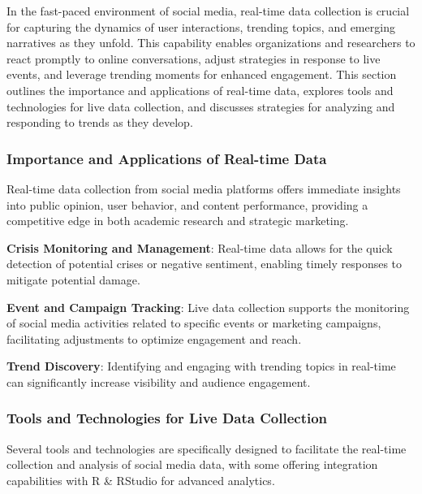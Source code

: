 \documentclass[
]{book}
\begin{document}
In the fast-paced environment of social media, real-time data collection is crucial for capturing the dynamics of user interactions, trending topics, and emerging narratives as they unfold. This capability enables organizations and researchers to react promptly to online conversations, adjust strategies in response to live events, and leverage trending moments for enhanced engagement. This section outlines the importance and applications of real-time data, explores tools and technologies for live data collection, and discusses strategies for analyzing and responding to trends as they develop.

\hypertarget{importance-and-applications-of-real-time-data}{%
\subsubsection*{Importance and Applications of Real-time Data}\label{importance-and-applications-of-real-time-data}}

Real-time data collection from social media platforms offers immediate insights into public opinion, user behavior, and content performance, providing a competitive edge in both academic research and strategic marketing.

\textbf{Crisis Monitoring and Management}: Real-time data allows for the quick detection of potential crises or negative sentiment, enabling timely responses to mitigate potential damage.

\textbf{Event and Campaign Tracking}: Live data collection supports the monitoring of social media activities related to specific events or marketing campaigns, facilitating adjustments to optimize engagement and reach.

\textbf{Trend Discovery}: Identifying and engaging with trending topics in real-time can significantly increase visibility and audience engagement.

\hypertarget{tools-and-technologies-for-live-data-collection}{%
\subsubsection*{Tools and Technologies for Live Data Collection}\label{tools-and-technologies-for-live-data-collection}}

Several tools and technologies are specifically designed to facilitate the real-time collection and analysis of social media data, with some offering integration capabilities with R \& RStudio for advanced analytics.
\end{document}

